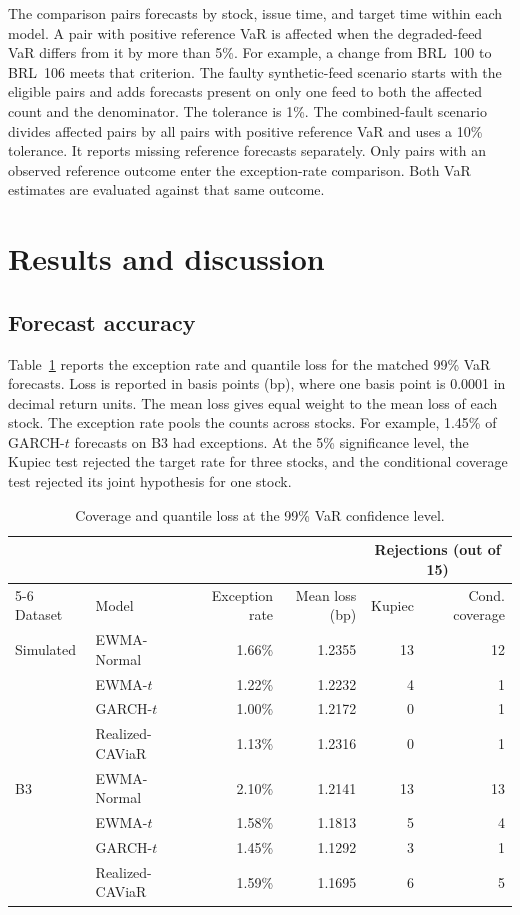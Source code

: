 \documentclass[
	12pt,				%
	openright,			%
	twoside,			%
	a4paper,
	chapter=TITLE,
	english				%
	]{abntex2}
\begin{document}
The comparison pairs forecasts by stock, issue time, and target time within each model. A pair with positive reference VaR is affected when the degraded-feed VaR differs from it by more than 5\%. For example, a change from BRL~100 to BRL~106 meets that criterion. The faulty synthetic-feed scenario starts with the eligible pairs and adds forecasts present on only one feed to both the affected count and the denominator. The tolerance is 1\%. The combined-fault scenario divides affected pairs by all pairs with positive reference VaR and uses a 10\% tolerance. It reports missing reference forecasts separately. Only pairs with an observed reference outcome enter the exception-rate comparison. Both VaR estimates are evaluated against that same outcome.

\section{Results and discussion}
\label{sec:resultados}

\subsection{Forecast accuracy} \label{sec:forecast-accuracy}

Table~\ref{tab:accuracy} reports the exception rate and quantile loss for the matched 99\% VaR forecasts. Loss is reported in basis points (bp), where one basis point is 0.0001 in decimal return units. The mean loss gives equal weight to the mean loss of each stock. The exception rate pools the counts across stocks. For example, 1.45\% of GARCH-$t$ forecasts on B3 had exceptions. At the 5\% significance level, the Kupiec test rejected the target rate for three stocks, and the conditional coverage test rejected its joint hypothesis for one stock.

\begin{table}[htbp]
\centering
\caption{Coverage and quantile loss at the 99\% VaR confidence level.}
\label{tab:accuracy}
\small
\begin{tabular}{@{}llrrrr@{}}
\toprule
 & & & & \multicolumn{2}{c}{Rejections (out of 15)} \\
\cmidrule(l){5-6}
Dataset & Model & Exception rate & Mean loss (bp) & Kupiec & Cond. coverage \\
\midrule
Simulated & EWMA-Normal & 1.66\% & 1.2355 & 13 & 12 \\
          & EWMA-$t$ & 1.22\% & 1.2232 & 4 & 1 \\
          & GARCH-$t$ & 1.00\% & 1.2172 & 0 & 1 \\
          & Realized-CAViaR & 1.13\% & 1.2316 & 0 & 1 \\
\addlinespace
B3 & EWMA-Normal & 2.10\% & 1.2141 & 13 & 13 \\
   & EWMA-$t$ & 1.58\% & 1.1813 & 5 & 4 \\
   & GARCH-$t$ & 1.45\% & 1.1292 & 3 & 1 \\
   & Realized-CAViaR & 1.59\% & 1.1695 & 6 & 5 \\
\bottomrule
\end{tabular}
\end{table}
\end{document}
